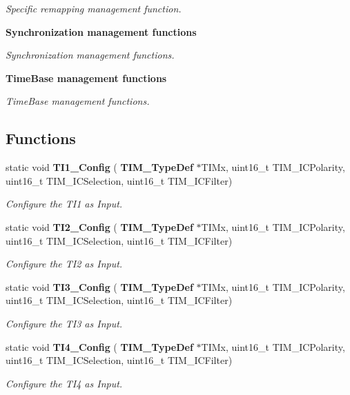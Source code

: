\begin{DoxyCompactItemize}
\begin{DoxyCompactList}\small\item\em Specific remapping management function. \end{DoxyCompactList}\item 
\textbf{ Synchronization management functions}
\begin{DoxyCompactList}\small\item\em Synchronization management functions. \end{DoxyCompactList}\item 
\textbf{ Time\+Base management functions}
\begin{DoxyCompactList}\small\item\em Time\+Base management functions. \end{DoxyCompactList}\end{DoxyCompactItemize}
\subsection*{Functions}
\begin{DoxyCompactItemize}
\item 
static void \textbf{ T\+I1\+\_\+\+Config} (\textbf{ T\+I\+M\+\_\+\+Type\+Def} $\ast$T\+I\+Mx, uint16\+\_\+t T\+I\+M\+\_\+\+I\+C\+Polarity, uint16\+\_\+t T\+I\+M\+\_\+\+I\+C\+Selection, uint16\+\_\+t T\+I\+M\+\_\+\+I\+C\+Filter)
\begin{DoxyCompactList}\small\item\em Configure the T\+I1 as Input. \end{DoxyCompactList}\item 
static void \textbf{ T\+I2\+\_\+\+Config} (\textbf{ T\+I\+M\+\_\+\+Type\+Def} $\ast$T\+I\+Mx, uint16\+\_\+t T\+I\+M\+\_\+\+I\+C\+Polarity, uint16\+\_\+t T\+I\+M\+\_\+\+I\+C\+Selection, uint16\+\_\+t T\+I\+M\+\_\+\+I\+C\+Filter)
\begin{DoxyCompactList}\small\item\em Configure the T\+I2 as Input. \end{DoxyCompactList}\item 
static void \textbf{ T\+I3\+\_\+\+Config} (\textbf{ T\+I\+M\+\_\+\+Type\+Def} $\ast$T\+I\+Mx, uint16\+\_\+t T\+I\+M\+\_\+\+I\+C\+Polarity, uint16\+\_\+t T\+I\+M\+\_\+\+I\+C\+Selection, uint16\+\_\+t T\+I\+M\+\_\+\+I\+C\+Filter)
\begin{DoxyCompactList}\small\item\em Configure the T\+I3 as Input. \end{DoxyCompactList}\item 
static void \textbf{ T\+I4\+\_\+\+Config} (\textbf{ T\+I\+M\+\_\+\+Type\+Def} $\ast$T\+I\+Mx, uint16\+\_\+t T\+I\+M\+\_\+\+I\+C\+Polarity, uint16\+\_\+t T\+I\+M\+\_\+\+I\+C\+Selection, uint16\+\_\+t T\+I\+M\+\_\+\+I\+C\+Filter)
\begin{DoxyCompactList}\small\item\em Configure the T\+I4 as Input. \end{DoxyCompactList}\end{DoxyCompactItemize}


